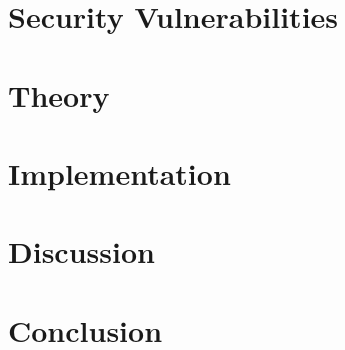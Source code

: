 \chapter{Security Vulnerabilities}


\chapter{Theory}
















\chapter{Implementation}












\chapter{Discussion}




\chapter{Conclusion}


\appendix







\printbibliography

